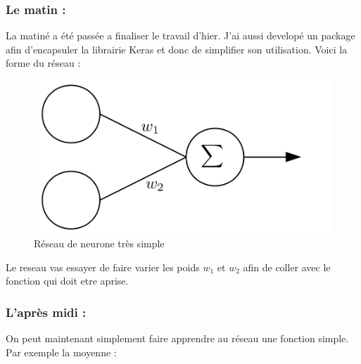 \subsubsection*{Le matin :}
La matiné a été passée a finaliser le travail d'hier.
J'ai aussi developé un package afin d'encapsuler la librairie Keras et donc de simplifier son utilisation.
Voici la forme du réseau :
\begin{figure}[H]
    \center
    \includegraphics[height=\petit]{sources/pictures/network1.png}
	\caption{Réseau de neurone très simple}
	\label{n1}
\end{figure}
Le reseau vas essayer de faire varier les poids $w_1$ et $w_2$ afin de coller avec le fonction qui doit etre aprise.


\subsubsection*{L'après midi :}
On peut maintenant simplement faire apprendre au réseau une fonction simple.
Par exemple la moyenne :

